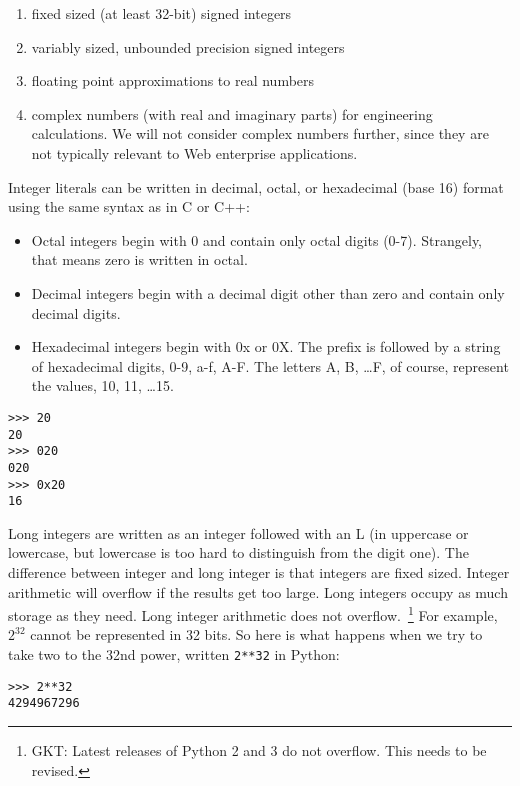\begin{enumerate}
\item fixed sized (at least 32-bit) signed integers
\item variably sized, unbounded precision signed integers
\item floating point approximations to real numbers
\item complex numbers (with real and imaginary parts) for engineering calculations. We will not consider complex numbers further, since they are not typically relevant to Web enterprise applications.
\end{enumerate}

Integer literals can be written in
decimal, octal, or hexadecimal (base 16) format using the same syntax as
in C or C++:

\begin{itemize}

\item
  Octal integers begin with 0 and
  contain only octal digits (0-7). Strangely, that means zero is written
  in octal.
\item
  Decimal integers begin with a
  decimal digit other than zero and contain only decimal digits.
\item
  Hexadecimal integers begin with
  0x or 0X. The prefix is followed by a string of hexadecimal digits,
  0-9, a-f, A-F. The letters A, B, \ldots F, of course, represent the
  values, 10, 11, \ldots 15.
\end{itemize}


\begin{verbatim}
>>> 20
20
>>> 020
020
>>> 0x20
16
\end{verbatim}

Long integers are written as an
integer followed with an L (in uppercase or lowercase, but lowercase is too
hard to distinguish from the digit one). The difference between integer
and long integer is that integers are fixed sized. Integer arithmetic
will overflow if the results get too large. Long integers occupy as much
storage as they need. Long integer arithmetic does not overflow.~\footnote{GKT: Latest releases of Python 2 and 3 do not overflow. This needs to be revised.} For
example, $2^{32}$ cannot be represented in 32 bits. So here is what
happens when we try to take two to the 32nd power, written \texttt{2**32}
in Python:


\begin{verbatim}
>>> 2**32
4294967296
\end{verbatim}


